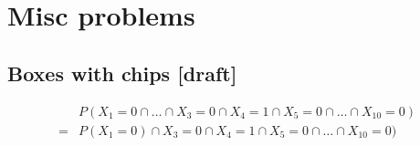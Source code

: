 \documentclass{article}
\begin{document}
\section{Misc problems}
\subsection{Boxes with chips [draft]}

\begin{align*}
     & P(X_1=0\cap \ldots \cap X_3=0\cap X_4=1 \cap X_5=0 \cap\ldots \cap X_{10}=0) \\
    =& P(X_1=0)\cap X_3=0\cap X_4=1 \cap X_5=0 \cap\ldots \cap X_{10}=0) \\
\end{align*}
\end{document}
